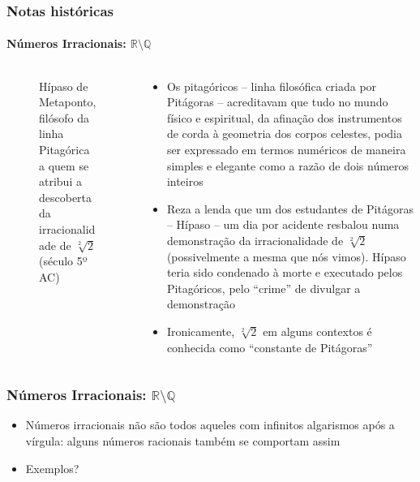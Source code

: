 \documentclass[usenames,dvipsnames,svgnames]{beamer}
\begin{document}
\begin{frame}	
	\frametitle{Notas históricas}
	\framesubtitle{Números Irracionais: $\mathbb{R} \setminus \mathbb{Q}$}

	\begin{columns}[t]
	\begin{column}{.25\textwidth}
		\begin{figure}
			\caption{\small Hípaso de Metaponto, filósofo da linha Pitagórica a quem se atribui a descoberta da irracionalidade de $\sqrt[2]{2}$ (século 5º AC)}
		\end{figure}
	\end{column}
	\begin{column}{.75\textwidth}
		\small
		\begin{itemize}
		\item Os pitagóricos -- linha filosófica criada por Pitágoras -- acreditavam que tudo no mundo físico e espiritual, da afinação dos instrumentos de corda à geometria dos corpos celestes, podia ser expressado em termos numéricos de maneira simples e elegante como a razão de dois números inteiros
		\item Reza a lenda que um dos estudantes de Pitágoras -- Hípaso -- um dia por acidente resbalou numa demonstração da irracionalidade de $\sqrt[2]{2}$ (possivelmente a mesma que nós vimos). Hípaso teria sido condenado à morte e executado pelos Pitagóricos, pelo ``crime'' de divulgar a demonstração
		\item Ironicamente, $\sqrt[2]{2}$ em alguns contextos é conhecida como ``constante de Pitágoras''
		\end{itemize}
	\end{column}
	\end{columns}
\end{frame}

\begin{frame}	
	\frametitle{Números Irracionais: $\mathbb{R} \setminus \mathbb{Q}$}

	\begin{itemize}
		\item Números irracionais não são todos aqueles com infinitos algarismos após a vírgula: alguns números racionais também se comportam assim
		\item Exemplos?
	\end{itemize}
\end{frame}
\end{document}
